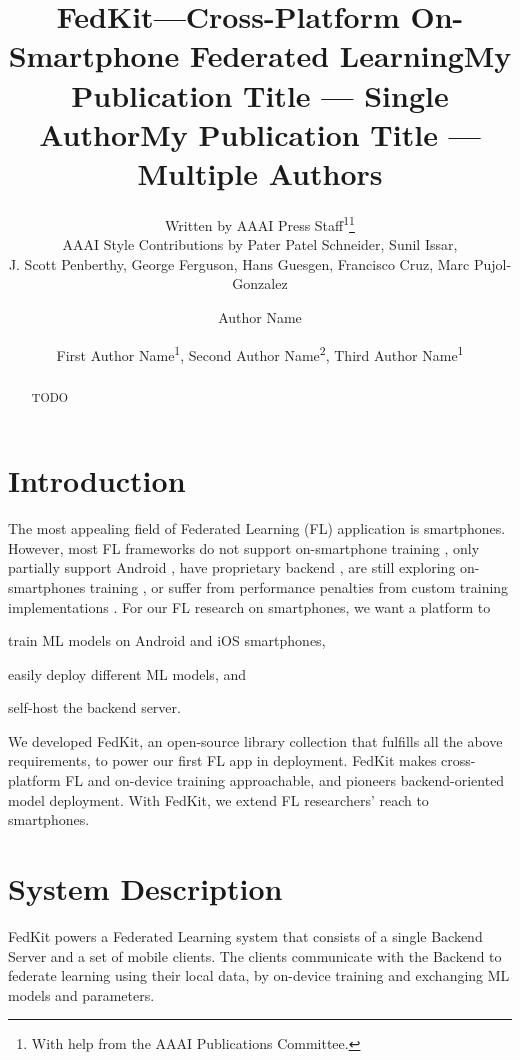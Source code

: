 \documentclass[letterpaper]{article} %
\title{FedKit---Cross-Platform On-Smartphone Federated Learning}
\author{
    Written by AAAI Press Staff\textsuperscript{\rm 1}\thanks{With help from the AAAI Publications Committee.}\\
    AAAI Style Contributions by Pater Patel Schneider,
    Sunil Issar,\\
    J. Scott Penberthy,
    George Ferguson,
    Hans Guesgen,
    Francisco Cruz\equalcontrib,
    Marc Pujol-Gonzalez\equalcontrib
}
\title{My Publication Title --- Single Author}
\author {
    Author Name
}
\title{My Publication Title --- Multiple Authors}
\author {
    First Author Name\textsuperscript{\rm 1},
    Second Author Name\textsuperscript{\rm 2},
    Third Author Name\textsuperscript{\rm 1}
}
\begin{document}
\maketitle

\begin{abstract}
    TODO
\end{abstract}

\section{Introduction}

The most appealing field of Federated Learning (FL) application is smartphones.
However, most FL frameworks do not support on-smartphone training
\cite{}, %
only partially support Android \cite{he2020fedml},
have proprietary backend \cite{he2020fedml,madrigal2023project},
are still exploring on-smartphones training
\cite{beutel2020flower,mathur2021ondevice}, or
suffer from performance penalties from custom training implementations
\cite{ryffel2018generic,Ziller2021,hall2021syft}.
For our FL research on smartphones,
we want a platform to
\begin{enumerate*}[label=\arabic*)]
    \item train ML models on Android and iOS smartphones,
    \item easily deploy different ML models, and
    \item self-host the backend server.
\end{enumerate*}

We developed FedKit,
an open-source library collection that fulfills all the above requirements,
to power our first FL app in deployment.
FedKit makes cross-platform FL and on-device training approachable,
and pioneers backend-oriented model deployment.
With FedKit, we extend FL researchers' reach to smartphones.

\section{System Description}

\newcommand{\model}{$M$}
\newcommand{\fs}{$S_\mathrm F$}

FedKit powers a Federated Learning system that
consists of a single Backend Server and a set of mobile clients.
The clients communicate with the Backend to federate learning
using their local data,
by on-device training and exchanging ML models and parameters.
\end{document}
